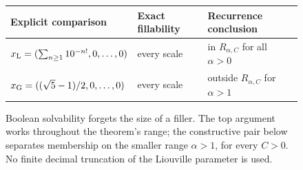 \begin{figure}[tbp]
\centering
{}
\medskip
\begin{tabular}{@{}lll@{}}
\toprule
Explicit comparison & Exact fillability & Recurrence conclusion\\\midrule
$x_{\rm L}=(\sum_{n\geq1}10^{-n!},0,\ldots,0)$ & every scale & in $R_{\alpha,C}$ for all $\alpha>0$\\[3pt]
$x_{\rm G}=((\sqrt5-1)/2,0,\ldots,0)$ & every scale & outside $R_{\alpha,C}$ for $\alpha>1$\\\bottomrule
\end{tabular}
\caption{Boolean solvability forgets the size of a filler. The top
argument works throughout the theorem's range; the constructive pair
below separates membership on the smaller range $\alpha>1$, for every
$C>0$. No finite decimal truncation of the Liouville parameter is used.}
\label{fig:arithmetic-boolean}
\end{figure}
